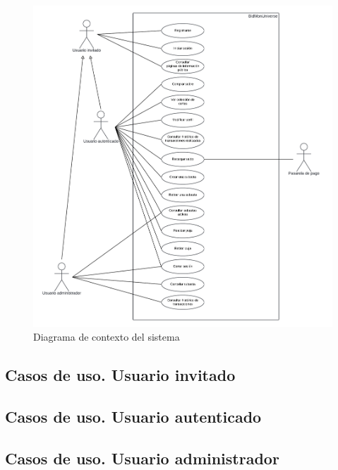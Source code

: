 \begin{figure}[H]
    \centering
    \includegraphics[width=1\textwidth]{figures/6-Analisis/6-Casos-uso/6_Diagrama-contexto.png}
    \caption{Diagrama de contexto del sistema}
    \label{fig:diagrama_contexto}
\end{figure}


\subsection{Casos de uso. Usuario invitado}


\subsection{Casos de uso. Usuario autenticado}


\subsection{Casos de uso. Usuario administrador}
